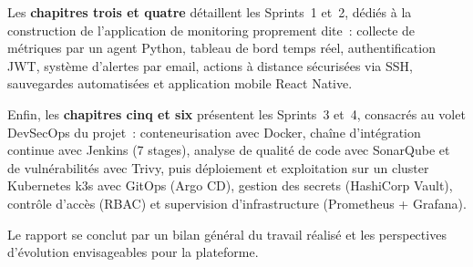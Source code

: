 Les \textbf{chapitres trois et quatre} détaillent les Sprints~1 et~2, dédiés à la construction de l'application de monitoring proprement dite~: collecte de métriques par un agent Python, tableau de bord temps réel, authentification JWT, système d'alertes par email, actions à distance sécurisées via SSH, sauvegardes automatisées et application mobile React Native.

Enfin, les \textbf{chapitres cinq et six} présentent les Sprints~3 et~4, consacrés au volet DevSecOps du projet~: conteneurisation avec Docker, chaîne d'intégration continue avec Jenkins (7 stages), analyse de qualité de code avec SonarQube et de vulnérabilités avec Trivy, puis déploiement et exploitation sur un cluster Kubernetes k3s avec GitOps (Argo CD), gestion des secrets (HashiCorp Vault), contrôle d'accès (RBAC) et supervision d'infrastructure (Prometheus + Grafana).

Le rapport se conclut par un bilan général du travail réalisé et les perspectives d'évolution envisageables pour la plateforme.
